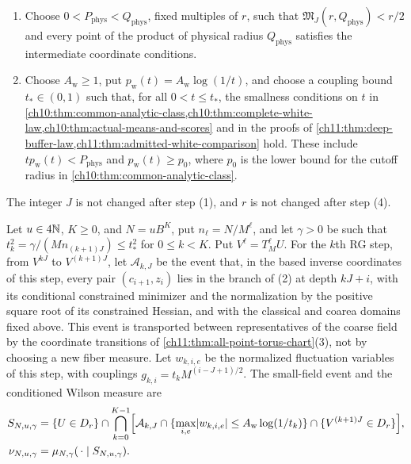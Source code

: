 \begin{definition}
\begin{enumerate}
\[ \frac{C\mathscr L'_{\mathrm{en}}r}{(1-C\mathscr L'_{\mathrm{en}}r)^3}<\frac14,
\]
with $C$ the constant of \eqref{ch11:eq:joint-Hessian}; and $M^{-J}Z(r)<r/4$, where $Z$ is the majorant of the zero-fluctuation reconstruction in \cref{ch10:thm:whole-image-gauge}. Choose $r\in(0,r_{\max}]$.
\item Choose $0<P_{\mathrm{phys}}<Q_{\mathrm{phys}}$, fixed multiples of $r$, such that $\mathfrak M_J(r,Q_{\mathrm{phys}})<r/2$ and every point of the product of physical radius $Q_{\mathrm{phys}}$ satisfies the intermediate coordinate conditions.
\item Choose $A_{\mathrm w}\ge1$, put $p_{\mathrm w}(t)=A_{\mathrm w}\log(1/t)$, and choose a coupling bound $t_*\in(0,1)$ such that, for all $0<t\le t_*$, the smallness conditions on $t$ in \cref{ch10:thm:common-analytic-class,ch10:thm:complete-white-law,ch10:thm:actual-means-and-scores} and in the proofs of \cref{ch11:thm:deep-buffer-law,ch11:thm:admitted-white-comparison} hold. These include $tp_{\mathrm w}(t)<P_{\mathrm{phys}}$ and $p_{\mathrm w}(t)\ge p_0$, where $p_0$ is the lower bound for the cutoff radius in \cref{ch10:thm:common-analytic-class}.
\end{enumerate}
The integer $J$ is not changed after step (1), and $r$ is not changed after step (4).

Let $u\in4\mathbb N$, $K\ge0$, and $N=uB^K$, put $n_\ell=N/M^\ell$, and let $\gamma>0$ be such that $t_k^2=\gamma/(Mn_{(k+1)J})\le t_*^2$ for $0\le k<K$. Put $V^\ell=T_M^\ell U$. For the $k$th RG step, from $V^{kJ}$ to $V^{(k+1)J}$, let $\mathcal A_{k,J}$ be the event that, in the based inverse coordinates of this step, every pair $(c_{i+1},z_i)$ lies in the branch of (2) at depth $kJ+i$, with its conditional constrained minimizer and the normalization by the positive square root of its constrained Hessian, and with the classical and coarea domains fixed above. This event is transported between representatives of the coarse field by the coordinate transitions of \cref{ch11:thm:all-point-torus-chart}(3), not by choosing a new fiber measure. Let $w_{k,i,e}$ be the normalized fluctuation variables of this step, with couplings $g_{k,i}=t_kM^{(i-J+1)/2}$. The small-field event and the conditioned Wilson measure are
\[
 \begin{split}
 S_{N,u,\gamma}={}&\{U\in D_r\}\cap
 \bigcap_{k=0}^{K-1}\Bigl[
 \mathcal A_{k,J}\cap\{\max_{i,e}\lvert w_{k,i,e}\rvert\le A_{\mathrm w}\log(1/t_k)\}
 \cap\{V^{(k+1)J}\in D_r\}\Bigr],\\
 \nu_{N,u,\gamma}={}&\mu_{N,\gamma}(\,\cdot\mid S_{N,u,\gamma}).
 \end{split}
\]
\end{definition}

